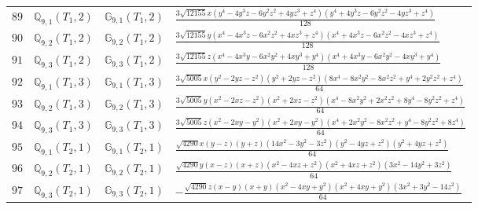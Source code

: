 \documentclass[fleqn,8pt,landscape]{jsarticle}
\begin{document}
\begin{table}[ht!]
\begin{center}
\begin{tabular}{cccl}
$ 89 $ & $ \mathbb{Q}_{9,1}(T_{1},2) $ & $ \mathbb{G}_{9,1}(T_{1},2) $ & $ \frac{3 \sqrt{12155} x \left(y^{4} - 4 y^{3} z - 6 y^{2} z^{2} + 4 y z^{3} + z^{4}\right) \left(y^{4} + 4 y^{3} z - 6 y^{2} z^{2} - 4 y z^{3} + z^{4}\right)}{128} $ \\
$ 90 $ & $ \mathbb{Q}_{9,2}(T_{1},2) $ & $ \mathbb{G}_{9,2}(T_{1},2) $ & $ \frac{3 \sqrt{12155} y \left(x^{4} - 4 x^{3} z - 6 x^{2} z^{2} + 4 x z^{3} + z^{4}\right) \left(x^{4} + 4 x^{3} z - 6 x^{2} z^{2} - 4 x z^{3} + z^{4}\right)}{128} $ \\
$ 91 $ & $ \mathbb{Q}_{9,3}(T_{1},2) $ & $ \mathbb{G}_{9,3}(T_{1},2) $ & $ \frac{3 \sqrt{12155} z \left(x^{4} - 4 x^{3} y - 6 x^{2} y^{2} + 4 x y^{3} + y^{4}\right) \left(x^{4} + 4 x^{3} y - 6 x^{2} y^{2} - 4 x y^{3} + y^{4}\right)}{128} $ \\
$ 92 $ & $ \mathbb{Q}_{9,1}(T_{1},3) $ & $ \mathbb{G}_{9,1}(T_{1},3) $ & $ \frac{3 \sqrt{5005} x \left(y^{2} - 2 y z - z^{2}\right) \left(y^{2} + 2 y z - z^{2}\right) \left(8 x^{4} - 8 x^{2} y^{2} - 8 x^{2} z^{2} + y^{4} + 2 y^{2} z^{2} + z^{4}\right)}{64} $ \\
$ 93 $ & $ \mathbb{Q}_{9,2}(T_{1},3) $ & $ \mathbb{G}_{9,2}(T_{1},3) $ & $ \frac{3 \sqrt{5005} y \left(x^{2} - 2 x z - z^{2}\right) \left(x^{2} + 2 x z - z^{2}\right) \left(x^{4} - 8 x^{2} y^{2} + 2 x^{2} z^{2} + 8 y^{4} - 8 y^{2} z^{2} + z^{4}\right)}{64} $ \\
$ 94 $ & $ \mathbb{Q}_{9,3}(T_{1},3) $ & $ \mathbb{G}_{9,3}(T_{1},3) $ & $ \frac{3 \sqrt{5005} z \left(x^{2} - 2 x y - y^{2}\right) \left(x^{2} + 2 x y - y^{2}\right) \left(x^{4} + 2 x^{2} y^{2} - 8 x^{2} z^{2} + y^{4} - 8 y^{2} z^{2} + 8 z^{4}\right)}{64} $ \\
$ 95 $ & $ \mathbb{Q}_{9,1}(T_{2},1) $ & $ \mathbb{G}_{9,1}(T_{2},1) $ & $ \frac{\sqrt{4290} x \left(y - z\right) \left(y + z\right) \left(14 x^{2} - 3 y^{2} - 3 z^{2}\right) \left(y^{2} - 4 y z + z^{2}\right) \left(y^{2} + 4 y z + z^{2}\right)}{64} $ \\
$ 96 $ & $ \mathbb{Q}_{9,2}(T_{2},1) $ & $ \mathbb{G}_{9,2}(T_{2},1) $ & $ \frac{\sqrt{4290} y \left(x - z\right) \left(x + z\right) \left(x^{2} - 4 x z + z^{2}\right) \left(x^{2} + 4 x z + z^{2}\right) \left(3 x^{2} - 14 y^{2} + 3 z^{2}\right)}{64} $ \\
$ 97 $ & $ \mathbb{Q}_{9,3}(T_{2},1) $ & $ \mathbb{G}_{9,3}(T_{2},1) $ & $ - \frac{\sqrt{4290} z \left(x - y\right) \left(x + y\right) \left(x^{2} - 4 x y + y^{2}\right) \left(x^{2} + 4 x y + y^{2}\right) \left(3 x^{2} + 3 y^{2} - 14 z^{2}\right)}{64} $ \\

\end{tabular}
\end{center}
\end{table}
\end{document}

